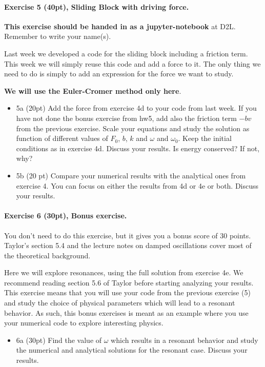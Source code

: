 \documentclass[%
oneside,                 %
final,                   %
10pt]{article}
\begin{document}
\paragraph{Exercise 5 (40pt), Sliding Block with driving force.}
\textbf{This exercise should be handed in as a jupyter-notebook} at D2L. Remember to write your name(s). 

Last week we developed a code for the sliding block including a friction term. This week we will simply reuse this code and add a force to it. The only thing we need to do is simply to add an expression for the force we want to study.

\textbf{We will use the Euler-Cromer method only here}.

\begin{itemize}
\item 5a (20pt) Add the force from exercise 4d to your code from last week. If you have not done the bonus exercise from hw5, add also the friction term $-bv$ from the previous exercise. Scale your equations and study the solution as function of different values of $F_0$, $b$, $k$ and $\omega$ and $\omega_0$. Keep the initial conditions as in exercise 4d. Discuss your results. Is energy conserved? If not, why? 

\item 5b (20 pt)  Compare your numerical results with the analytical ones from exercise 4. You can focus on either the results from 4d or 4e or both.  Discuss your results. 
\end{itemize}

\noindent
\paragraph{Exercise 6 (30pt), Bonus exercise.}
You don't need to do this exercise, but it gives you a bonus score of 30 points. Taylor's section 5.4 and the lecture notes on damped oscillations cover most of the theoretical background.

Here we will explore resonances, using the full solution from exercise
4e.  We recommend reading section 5.6 of Taylor before starting
analyzing your results.  This exercise means that you will use your
code from the previous exercise (5) and study the choice of physical
parameters which will lead to a resonant behavior. As such, this bonus
exercises is meant as an example where you use your numerical code to
explore interesting physics.

\begin{itemize}
\item 6a (30pt)  Find the value of $\omega$ which results in a resonant behavior and study the numerical and analytical solutions for the resonant case. Discuss your results. 
\end{itemize}

\noindent


\end{document}
